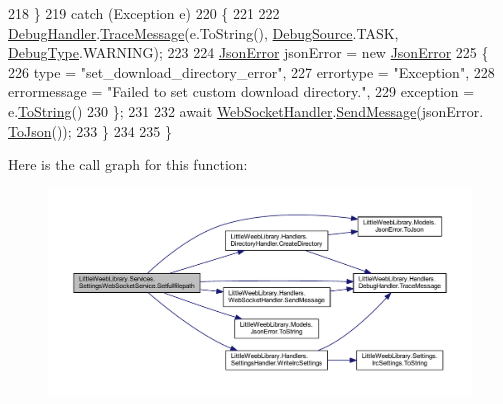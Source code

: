 \begin{DoxyCode}
218             \}
219             \textcolor{keywordflow}{catch} (Exception e)
220             \{
221 
222                 \mbox{\hyperlink{class_little_weeb_library_1_1_handlers_1_1_debug_handler}{DebugHandler}}.\mbox{\hyperlink{class_little_weeb_library_1_1_handlers_1_1_debug_handler_afccb37dfd6b2114af72000c2f4fe4607}{TraceMessage}}(e.ToString(), 
      \mbox{\hyperlink{namespace_little_weeb_library_1_1_handlers_a2a6ca0775121c9c503d58aa254d292be}{DebugSource}}.TASK, \mbox{\hyperlink{namespace_little_weeb_library_1_1_handlers_ab66019ed40462876ec4e61bb3ccb0a62}{DebugType}}.WARNING);
223 
224                 \mbox{\hyperlink{class_little_weeb_library_1_1_models_1_1_json_error}{JsonError}} jsonError = \textcolor{keyword}{new} \mbox{\hyperlink{class_little_weeb_library_1_1_models_1_1_json_error}{JsonError}}
225                 \{
226                     type = \textcolor{stringliteral}{"set\_download\_directory\_error"},
227                     errortype = \textcolor{stringliteral}{"Exception"},
228                     errormessage = \textcolor{stringliteral}{"Failed to set custom download directory."},
229                     exception = e.\mbox{\hyperlink{class_little_weeb_library_1_1_models_1_1_json_error_ad7d5522c90119111d2e929f39e7f6d3c}{ToString}}()
230                 \};
231 
232                 await \mbox{\hyperlink{class_little_weeb_library_1_1_handlers_1_1_web_socket_handler}{WebSocketHandler}}.\mbox{\hyperlink{class_little_weeb_library_1_1_handlers_1_1_web_socket_handler_a1de289d54d665a32c93478c68d3e6ad0}{SendMessage}}(jsonError.
      \mbox{\hyperlink{class_little_weeb_library_1_1_models_1_1_json_error_a0e3e7dd2e2990404b7f0461742b23440}{ToJson}}());
233             \}
234 
235         \}
\end{DoxyCode}
Here is the call graph for this function\+:\nopagebreak
\begin{figure}[H]
\begin{center}
\leavevmode
\includegraphics[width=350pt]{class_little_weeb_library_1_1_services_1_1_settings_web_socket_service_aef49a5d18d17b206d2807bba6c28f793_cgraph}
\end{center}
\end{figure}
